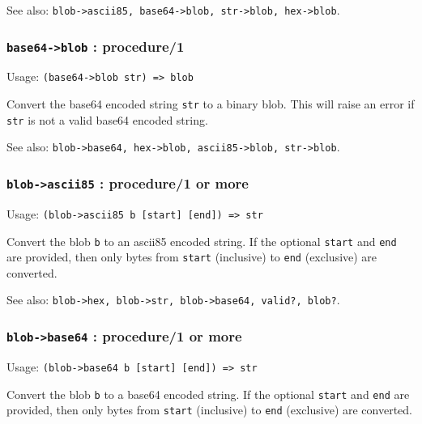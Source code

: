 \documentclass[
]{article}
\newcommand{\passthrough}[1]{#1}
\begin{document}
See also:
\passthrough{\lstinline!blob->ascii85, base64->blob, str->blob, hex->blob!}.

\hypertarget{base64-blob-procedure1}{%
\subsubsection{\texorpdfstring{\texttt{base64-\textgreater{}blob} :
procedure/1}{base64-\textgreater blob : procedure/1}}\label{base64-blob-procedure1}}

Usage: \passthrough{\lstinline!(base64->blob str) => blob!}

Convert the base64 encoded string \passthrough{\lstinline!str!} to a
binary blob. This will raise an error if \passthrough{\lstinline!str!}
is not a valid base64 encoded string.

See also:
\passthrough{\lstinline!blob->base64, hex->blob, ascii85->blob, str->blob!}.

\hypertarget{blob-ascii85-procedure1-or-more}{%
\subsubsection{\texorpdfstring{\texttt{blob-\textgreater{}ascii85} :
procedure/1 or
more}{blob-\textgreater ascii85 : procedure/1 or more}}\label{blob-ascii85-procedure1-or-more}}

Usage: \passthrough{\lstinline!(blob->ascii85 b [start] [end]) => str!}

Convert the blob \passthrough{\lstinline!b!} to an ascii85 encoded
string. If the optional \passthrough{\lstinline!start!} and
\passthrough{\lstinline!end!} are provided, then only bytes from
\passthrough{\lstinline!start!} (inclusive) to
\passthrough{\lstinline!end!} (exclusive) are converted.

See also:
\passthrough{\lstinline!blob->hex, blob->str, blob->base64, valid?, blob?!}.

\hypertarget{blob-base64-procedure1-or-more}{%
\subsubsection{\texorpdfstring{\texttt{blob-\textgreater{}base64} :
procedure/1 or
more}{blob-\textgreater base64 : procedure/1 or more}}\label{blob-base64-procedure1-or-more}}

Usage: \passthrough{\lstinline!(blob->base64 b [start] [end]) => str!}

Convert the blob \passthrough{\lstinline!b!} to a base64 encoded string.
If the optional \passthrough{\lstinline!start!} and
\passthrough{\lstinline!end!} are provided, then only bytes from
\passthrough{\lstinline!start!} (inclusive) to
\passthrough{\lstinline!end!} (exclusive) are converted.
\end{document}

